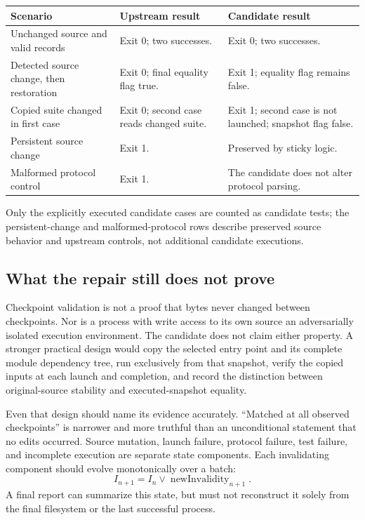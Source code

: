 \documentclass[11pt,a4paper]{article}
\begin{document}
\begin{longtable}{@{}L{0.32\textwidth}L{0.28\textwidth}L{0.31\textwidth}@{}}
\toprule
Scenario & Upstream result & Candidate result\\
\midrule
Unchanged source and valid records & Exit 0; two successes. & Exit 0; two successes.\\
Detected source change, then restoration & Exit 0; final equality flag true. & Exit 1; equality flag remains false.\\
Copied suite changed in first case & Exit 0; second case reads changed suite. & Exit 1; second case is not launched; snapshot flag false.\\
Persistent source change & Exit 1. & Preserved by sticky logic.\\
Malformed protocol control & Exit 1. & The candidate does not alter protocol parsing.\\
\bottomrule
\end{longtable}
Only the explicitly executed candidate cases are counted as candidate tests; the persistent-change and malformed-protocol rows describe preserved source behavior and upstream controls, not additional candidate executions.

\subsection{What the repair still does not prove}
Checkpoint validation is not a proof that bytes never changed between checkpoints. Nor is a process with write access to its own source an adversarially isolated execution environment. The candidate does not claim either property. A stronger practical design would copy the selected entry point and its complete module dependency tree, run exclusively from that snapshot, verify the copied inputs at each launch and completion, and record the distinction between original-source stability and executed-snapshot equality.

Even that design should name its evidence accurately. ``Matched at all observed checkpoints'' is narrower and more truthful than an unconditional statement that no edits occurred. Source mutation, launch failure, protocol failure, test failure, and incomplete execution are separate state components. Each invalidating component should evolve monotonically over a batch:
\begin{equation}
 I_{n+1}=I_n\lor\operatorname{newInvalidity}_{n+1}.
\end{equation}
A final report can summarize this state, but must not reconstruct it solely from the final filesystem or the last successful process.
\end{document}

